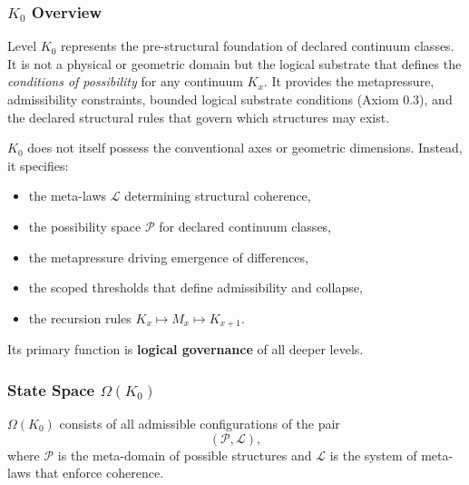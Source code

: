 

\subsubsection{\texorpdfstring{$K_0$}{K_0} Overview}
\label{sec:k0-overview}

Level $K_0$ represents the pre-structural foundation of declared continuum classes.
It is not a physical or geometric domain but the logical substrate that
defines the \emph{conditions of possibility} for any continuum $K_x$.
It provides the metapressure, admissibility constraints, bounded logical substrate conditions (Axiom 0.3), and the declared structural rules that govern which
structures may exist.

$K_0$ does not itself possess the conventional axes or geometric
dimensions.  
Instead, it specifies:
\begin{itemize}
    \item the meta-laws $\mathcal{L}$ determining structural coherence,
    \item the possibility space $\mathcal{P}$ for declared continuum classes,
    \item the metapressure driving emergence of differences,
    \item the scoped thresholds that define admissibility and collapse,
    \item the recursion rules $K_x \mapsto M_x \mapsto K_{x+1}$.
\end{itemize}

Its primary function is \textbf{logical governance} of all deeper
levels.

\subsubsection{State Space \texorpdfstring{$\Omega(K_0)$}{\Omega(K_0)}}

$\Omega(K_0)$ consists of all admissible configurations of the pair
\[
(\mathcal{P}, \mathcal{L}),
\]
where $\mathcal{P}$ is the meta-domain of possible structures and
$\mathcal{L}$ is the system of meta-laws that enforce coherence.

